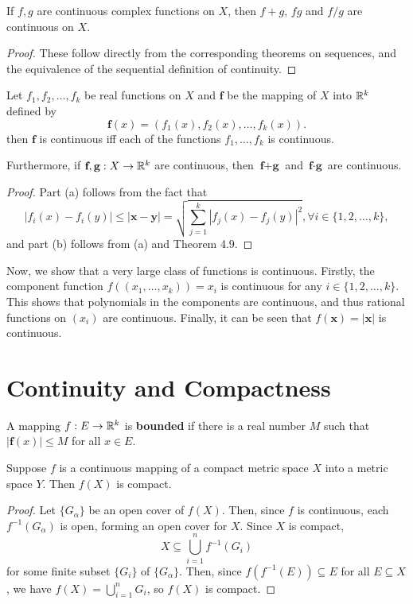 \begin{theorem} %
    If $f, g$ are continuous complex functions on $X$, then $f+g$, $fg$ and $f/g$ are continuous on $X$.
\begin{proof}
    These follow directly from the corresponding theorems on sequences, and the equivalence of the sequential definition of continuity.
\end{proof}
\end{theorem}

\begin{theorem} %
    Let $f_1, f_2, \dotsc, f_k$ be real functions on $X$ and $\textbf{f}$ be the mapping of $X$ into $\mathbb{R}^k$ defined by
    \[
        \textbf{f}(x) = (f_1(x), f_2(x), \dotsc, f_k(x)).
    \]
    then $\textbf{f}$ is continuous iff each of the functions $f_1, \dotsc, f_k$ is continuous.

Furthermore, if $\textbf{f}, \textbf{g}: X \rightarrow \mathbb{R}^k$ are continuous, then $\textbf{f} + \textbf{g}$ and $\textbf{f} \cdot \textbf{g}$ are continuous.

\begin{proof}
    Part (a) follows from the fact that
    \[
    |f_i(x) - f_i(y)| \le |\textbf{x} - \textbf{y}| = \sqrt{ \sum_{j=1}^{k} |f_j(x) - f_j(y)|^2}, \forall i \in \{1, 2, \dotsc, k\},
    \]
    and part (b) follows from (a) and Theorem 4.9.
\end{proof}
\end{theorem}

Now, we show that a very large class of functions is continuous. Firstly, the component function $f((x_1, \dotsc, x_k)) = x_i$ is continuous for any $i \in \{1, 2, \dotsc, k\}$. This shows that polynomials in the components are continuous, and thus rational functions on $(x_i)$ are continuous. Finally, it can be seen that $f(\textbf{x}) = |\textbf{x}|$ is continuous.

\section{Continuity and Compactness}

\begin{definition} %
    A mapping $f : E \rightarrow \mathbb{R}^k$ is \textbf{bounded} if there is a real number $M$ such that $|\textbf{f}(x)| \le M$ for all $x \in E$.
\end{definition}

\begin{theorem} %
    Suppose $f$ is a continuous mapping of a compact metric space $X$ into a metric space $Y$. Then $f(X)$ is compact.

\begin{proof}
    Let $\{G_\alpha\}$ be an open cover of $f(X)$. Then, since $f$ is continuous, each $f^{-1}(G_\alpha)$ is open, forming an open cover for $X$. Since $X$ is compact, 
    \[
        X \subseteq \bigcup_{i=1}^{n} f^{-1}(G_i)
    \]
    for some finite subset $\{G_i\}$ of $\{G_\alpha\}$. Then, since $f(f^{-1}(E)) \subseteq E$ for all $E \subseteq X$, we have $f(X) = \bigcup_{i=1}^{n} G_i$, so $f(X)$ is compact.
\end{proof}
\end{theorem}

